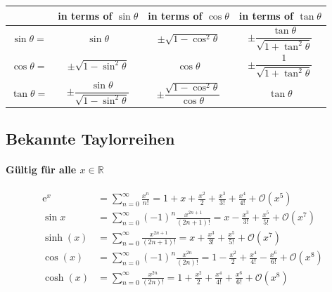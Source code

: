 \begin{center}
\begin{tabular}{|c|c|c|c|}
	\hline
	& \textbf{in terms of $\sin\theta$} & \textbf{in terms of $\cos\theta$} & \textbf{in terms of $\tan\theta$} \\ \hline
	$\sin\theta =$ & $\sin\theta$ & $\pm\sqrt{1-\cos^2\theta}$ & $\pm\dfrac{\tan\theta}{\sqrt{1+\tan^2\theta}}$ \\ \hline
	$\cos\theta =$ & $\pm\sqrt{1-\sin^2\theta}$ & $\cos\theta$ & $\pm\dfrac{1}{\sqrt{1+\tan^2\theta}}$ \\ \hline
	$\tan\theta =$ & $\pm\dfrac{\sin\theta}{\sqrt{1-\sin^2\theta}}$ & $\pm\dfrac{\sqrt{1-\cos^2\theta}}{\cos\theta}$ & $\tan\theta$ \\ \hline
\end{tabular}
\end{center}

\egroup


\subsection{Bekannte Taylorreihen}

\paragraph{Gültig für alle $x\in\mathbb{R}$}
\begin{align*}
        \mathrm{e}^x &= \sum_{n=0}^{\infty}\frac{x^n}{n!}
        = 1+x+\frac{x^2}{2}+\frac{x^3}{3!}+\frac{x^4}{4!}+\mathcal{O}(x^5) \\
        \sin{x} &= \sum_{n=0}^{\infty}(-1)^n\frac{x^{2n+1}}{(2n+1)!}
        = x-\frac{x^3}{3!}+\frac{x^5}{5!}+\mathcal{O}(x^7) \\
        \sinh(x) &= \sum_{n=0}^{\infty}\frac{x^{2n+1}}{(2n+1)!}
        = x+\frac{x^3}{3!}+\frac{x^5}{5!}+\mathcal{O}(x^7) \\
        \cos(x) &= \sum_{n=0}^{\infty}(-1)^n\frac{x^{2n}}{(2n)!}
        = 1-\frac{x^2}{2}+\frac{x^4}{4!}-\frac{x^6}{6!}+\mathcal{O}(x^8) \\
        \cosh(x) &= \sum_{n=0}^{\infty}\frac{x^{2n}}{(2n)!}
        = 1+\frac{x^2}{2}+\frac{x^4}{4!}+\frac{x^6}{6!}+\mathcal{O}(x^8)
\end{align*}

